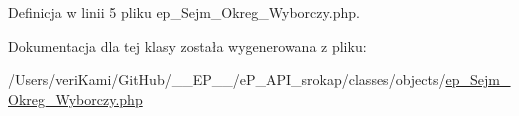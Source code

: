 Definicja w linii 5 pliku ep\-\_\-\-Sejm\-\_\-\-Okreg\-\_\-\-Wyborczy.\-php.



Dokumentacja dla tej klasy została wygenerowana z pliku\-:\begin{DoxyCompactItemize}
\item 
/\-Users/veri\-Kami/\-Git\-Hub/\-\_\-\-\_\-\-E\-P\-\_\-\-\_\-/e\-P\-\_\-\-A\-P\-I\-\_\-srokap/classes/objects/\hyperlink{ep___sejm___okreg___wyborczy_8php}{ep\-\_\-\-Sejm\-\_\-\-Okreg\-\_\-\-Wyborczy.\-php}\end{DoxyCompactItemize}
